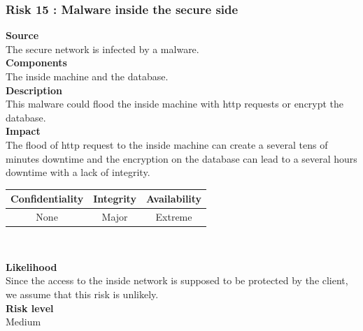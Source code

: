\documentclass[a4paper,11pt]{article}
\begin{document}
\subsubsection{Risk 15 : Malware inside the secure side}
\textbf{Source} \\The secure network is infected by a malware.\\
\textbf{Components} \\The inside machine and the database.\\
\textbf{Description}\\This malware could flood the inside machine with http requests or encrypt the database.  \\
\textbf{Impact}\\
The flood of http request to the inside machine can create a several tens of minutes downtime and the encryption on the database can lead to a several hours downtime with a lack of integrity.\\
\begin{center}
\begin{tabular}{|c|c|c|}
\hline
\textbf{Confidentiality} & \textbf{Integrity} & \textbf{Availability} \\
\hline
None & Major & Extreme \\
\hline
\end{tabular}\\
\end{center}
\textbf{Likelihood}\\Since the access to the inside network is supposed to be protected by the client, we assume that this risk is unlikely.\\
\textbf{Risk level}\\Medium\\
\end{document}
